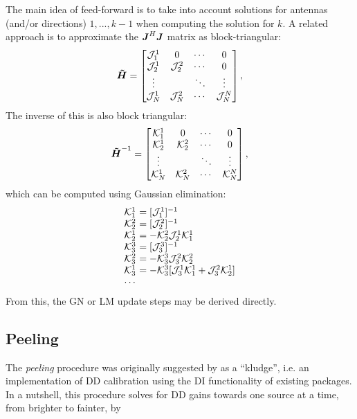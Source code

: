 \documentclass[useAMS,usenatbib]{mn2e}
\makeatletter
\newcommand{\mat}[1]{{\bmath{#1}}}
\newcommand{\JJ}{\mat{J}} %
\newcommand{\HHa}{\mat{\tilde{H}}} %
\newcommand{\JHJ}{\JJ^H\JJ} %
\newcommand{\Matrix}[2]{\left [ \begin{array}{@{}#1@{}}#2\end{array} \right ]}
\numberwithin{equation}{section}
\makeatother
\begin{document}
The main idea of feed-forward is to take into account solutions for antennas (and/or directions) $1,...,k-1$ when computing the
solution for $k$. A related approach is to approximate the $\JHJ$ matrix as block-triangular:
\begin{equation}
\label{eq:JHJ:DD:block-triag}
\HHa = \Matrix{cccc}{
\JJJ^1_1 & 0 & \cdots & 0 \\
\JJJ^1_2 & \JJJ^2_2 & \cdots & 0 \\
\vdots & & \ddots &  \vdots \\
\JJJ_{N}^1 & \JJJ_{N}^2 & \cdots & \JJJ_{N}^{N} },
\end{equation}
\newcommand{\KKK}{\mathcal{K}}
The inverse of this is also block triangular:
\begin{equation}
\label{eq:JHJ:DD:block-triag-inv}
\HHa^{-1} = \Matrix{cccc}{
\KKK^1_1 & 0 & \cdots & 0 \\
\KKK^1_2 & \KKK^2_2 & \cdots & 0 \\
\vdots & & \ddots &  \vdots \\
\KKK_{N}^1 & \KKK_{N}^2 & \cdots & \KKK_{N}^{N} },
\end{equation}
which can be computed using Gaussian elimination:
\begin{equation}
\begin{array}{l@{~}l}
\KKK^1_1 &= [\JJJ^1_1]^{-1} \\
\KKK^2_2 &= [\JJJ^2_2]^{-1} \\
\KKK^1_2 &= - \KKK^2_2 \JJJ^1_2 \KKK^1_1\\
\KKK^3_3 &= [\JJJ^3_3]^{-1} \\
\KKK^2_3 &= - \KKK^3_3 \JJJ^2_3 \KKK^2_2\\
\KKK^1_3 &= - \KKK^3_3 [ \JJJ^1_3 \KKK^1_1 + \JJJ^2_3 \KKK^1_2  ]\\
\cdots
\end{array}
\end{equation}
From this, the GN or LM update steps may be derived directly.

\subsection{Peeling}
\label{sec:peeling}

The \emph{peeling} procedure was originally suggested by \citet{JEN:peeling} as a ``kludge'', i.e. an implementation of DD calibration 
using the DI functionality of existing packages. In a nutshell, this procedure solves for DD gains towards one source at a time, from
brighter to fainter, by
\end{document}
